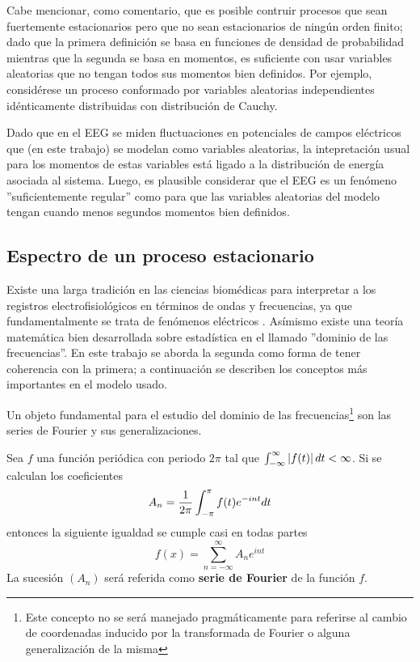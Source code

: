 Cabe mencionar, como comentario, que es posible contruir procesos que sean fuertemente
estacionarios pero que no sean estacionarios de ning\'un orden finito; dado que
la primera definici\'on se basa en funciones de densidad de probabilidad mientras que la segunda
se basa en momentos, es suficiente con usar variables aleatorias que no tengan todos
sus momentos bien definidos. Por ejemplo, consid\'erese un proceso conformado por variables
aleatorias independientes id\'enticamente distribuidas con distribuci\'on de Cauchy.

Dado que en el EEG se miden fluctuaciones en potenciales de campos el\'ectricos
que (en este trabajo) se modelan como variables aleatorias, 
la intepretaci\'on usual para los momentos de estas variables est\'a ligado a la distribuci\'on de
energ\'ia asociada al sistema. Luego, es plausible considerar que el EEG es un fen\'omeno
''suficientemente regular'' como para que las variables aleatorias del modelo tengan cuando
menos segundos momentos bien definidos.


\subsection{Espectro de un proceso estacionario}

Existe una larga tradici\'on en las ciencias biom\'edicas para interpretar a los registros
electrofisiol\'ogicos en t\'erminos de ondas y frecuencias, ya que fundamentalmente se
trata de fen\'omenos el\'ectricos \cite{Kaiser00}. 
As\'imismo existe una teor\'ia matem\'atica bien desarrollada sobre estad\'istica en el 
llamado ''dominio de las frecuencias''. 
En este trabajo se aborda la segunda como forma de tener coherencia con la primera; a continuaci\'on
se describen los conceptos m\'as importantes en el modelo usado.

Un objeto fundamental para el estudio del dominio de las frecuencias\footnote{Este concepto 
no se
ser\'a manejado pragm\'aticamente para referirse
al cambio de coordenadas inducido por la transformada de Fourier o alguna generalizaci\'on de la 
misma} son las series de Fourier y sus generalizaciones. 

\begin{defn}
Sea $f$ una funci\'on peri\'odica con periodo $2\pi$ tal que $\int_{-\infty}^{\infty} \left| f(t) \right| dt < \infty$. 
Si se calculan los coeficientes
\begin{equation*}
A_n = \frac{1}{2\pi} \int_{-\pi}^{\pi} f(t) e^{- i n t} dt
\end{equation*}
entonces la siguiente igualdad se cumple casi en todas partes
\begin{equation*}
f(x) = \sum_{n=-\infty}^{\infty} A_n e^{i n t}
\end{equation*}
La sucesi\'on $\left( A_n \right)$ ser\'a referida como \textbf{serie de Fourier} de la funci\'on
$f$.
\label{FourierClasico}
\end{defn}

